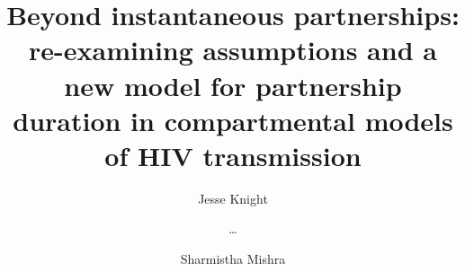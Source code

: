 \title{Beyond instantaneous partnerships:
  re-examining assumptions and a new model for partnership duration
  in compartmental models of HIV transmission}
\author[1]{Jesse Knight}
\author[1]{\dots}
\author[1]{Sharmistha Mishra}
\abstract{}
\highlights{}
\data{}
\funding{}
\acknowl{}
\contrib{}